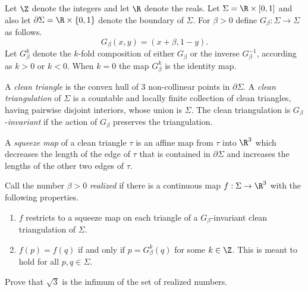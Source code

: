 Let $\Z$ denote the integers and let $\R$ denote the reals.
Let $\Sigma= \R \times [0,1]$ and also let
$\partial \Sigma=\R \times \{0,1\}$ denote the boundary
of $\Sigma$. 
For $\beta>0$ define $G_{\beta}: \Sigma \to \Sigma$ as follows.
$$G_{\beta}(x,y)=(x+\beta,1-y).$$
Let $G_{\beta}^k$ denote the $k$-fold composition of either
$G_{\beta}$
or the inverse $G_{\beta}^{-1}$, according as $k>0$ or $k<0$.
When $k=0$ the map $G_{\beta}^k$ is the identity map.

A {\it clean triangle\/} is the convex hull  of $3$
non-collinear points
in $\partial \Sigma$. 
A {\it clean triangulation\/} of $\Sigma$ is a countable and
locally finite collection
of clean triangles, having pairwise disjoint interiors, whose union
is $\Sigma$.  The clean triangulation is
$G_{\beta}$-{\it invariant\/} if the action of $G_{\beta}$ preserves
the triangulation.

A {\it squeeze map\/} of a clean triangle $\tau$
is an affine map from $\tau$ into $\R^3$ which decreases the
length of the edge of $\tau$ that is contained in
$\partial \Sigma$ and increases the
lengths of the other two edges of $\tau$.

Call the number $\beta>0$ {\it realized\/} if there is a
continuous map $f: \Sigma \to \R^3$
with the following properties.
\begin{enumerate}
\item $f$ restricts to a squeeze map on each triangle of a
  $G_{\beta}$-invariant clean triangulation of $\Sigma$.
  \item   $f(p)=f(q)$ if and only if  $p=G_{\beta}^k(q)$ for some $k
    \in \Z$.
    This is meant to hold for all $p,q \in \Sigma$.
  \end{enumerate}
  Prove that $\sqrt 3$ is the infimum of the set of realized numbers.